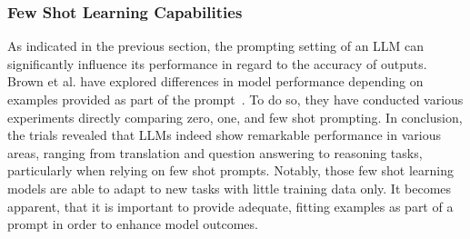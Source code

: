 \subsubsection{Few Shot Learning Capabilities}
As indicated in the previous section, the prompting setting of an LLM can significantly influence its
performance in regard to the accuracy of outputs.
Brown et al\(.\) have explored differences
in model performance depending on examples provided as part of the prompt~\cite{brown_language_2020}.
To do so, they have conducted various experiments directly comparing zero, one, and few shot
prompting.
In conclusion, the trials revealed that LLMs indeed show remarkable performance in various areas,
ranging from translation and question answering to reasoning tasks, particularly when relying on
few shot prompts.
Notably, those few shot learning models are able to adapt to new tasks with little training data
only.
It becomes apparent, that it is important to provide adequate, fitting examples as part of a
prompt in order to enhance model outcomes.

